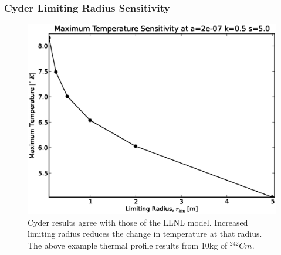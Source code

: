 \begin{frame}[ctb!]
\frametitle{Cyder Limiting Radius Sensitivity}
\begin{figure}[htbp!]
\begin{center}
\includegraphics[height=0.7\textheight]{./thermal_demonstration/spacing/lim_radius.eps}
\end{center}
\caption[$r_{lim}$ Sensitivity in Cyder]
{Cyder results agree with those of the LLNL model. Increased limiting radius 
reduces the change in temperature at that radius. The above example thermal 
profile results from 10kg of $^{242}Cm$.}
\label{fig:rs}
\end{figure}
\end{frame}



%
